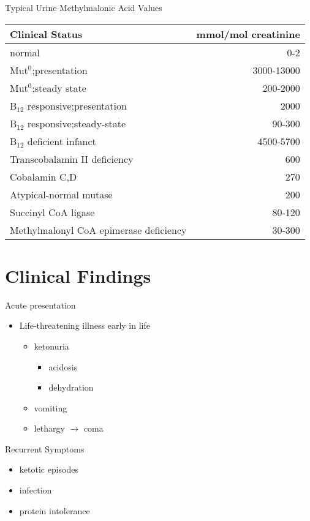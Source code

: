 \documentclass[presentation, smaller]{beamer}
\begin{document}
\begin{frame}[label={sec:orgheadline18}]{Typical Urine Methylmalonic Acid Values}
\begin{center}
\begin{tabular}{lr}
Clinical Status & mmol/mol creatinine\\
\hline
normal & 0-2\\
Mut\(^{\text{0}}\);presentation & 3000-13000\\
Mut\(^{\text{0}}\);steady state & 200-2000\\
B\(_{\text{12}}\) responsive;presentation & 2000\\
B\(_{\text{12}}\) responsive;steady-state & 90-300\\
B\(_{\text{12}}\) deficient infanct & 4500-5700\\
Transcobalamin II deficiency & 600\\
Cobalamin C,D & 270\\
Atypical-normal mutase & 200\\
Succinyl CoA ligase & 80-120\\
Methylmalonyl CoA epimerase deficiency & 30-300\\
\end{tabular}
\end{center}
\end{frame}

\section{Clinical Findings}
\label{sec:orgheadline25}
\begin{frame}[label={sec:orgheadline20}]{Acute presentation}
\begin{itemize}
\item Life-threatening illness early in life
\begin{itemize}
\item ketonuria
\begin{itemize}
\item acidosis
\item dehydration
\end{itemize}
\item vomiting
\item lethargy \(\to\) coma
\end{itemize}
\end{itemize}
\end{frame}

\begin{frame}[label={sec:orgheadline21}]{Recurrent Symptoms}
\begin{itemize}
\item ketotic episodes
\item infection
\item protein intolerance
\end{itemize}
\end{frame}
\end{document}
